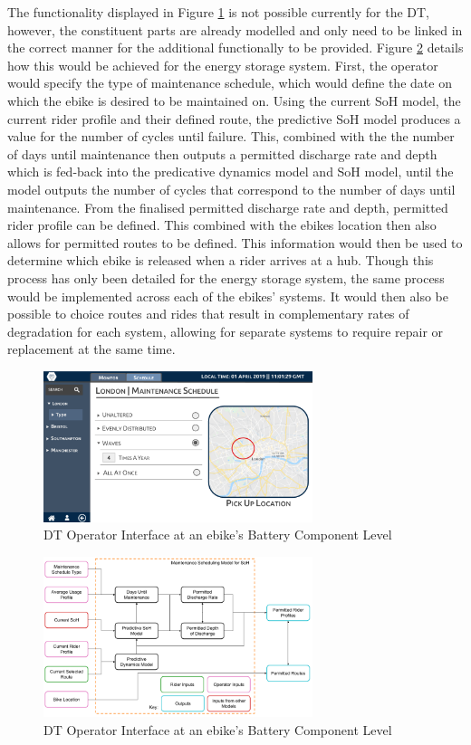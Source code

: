 \documentclass[a4paper, 10pt]{article}
\numberwithin{equation}{section}
\begin{document}
The functionality displayed in Figure \ref{fig:GUI_sch} is  not possible currently for the DT, however, the constituent parts are already modelled and only need to be linked in the correct manner for the additional functionally to be provided. Figure \ref{fig:GUI_SoH} details how this would be achieved for the energy storage system. First, the operator would specify the type of maintenance schedule, which would define the date on which the ebike is desired to be maintained on. Using the current SoH model, the current rider profile and their defined route, the predictive SoH model produces a value for the number of cycles until failure. This, combined with the the number of days until maintenance then outputs a permitted discharge rate and depth which is fed-back into the  predicative dynamics model and SoH model, until the model outputs the number of cycles that correspond to the number of days until maintenance. From the finalised permitted discharge rate and depth, permitted rider profile can be defined. This combined with the ebikes location then also allows for permitted routes to be defined. This information would then be used to determine which ebike is released when a rider arrives at a hub. Though this process has only been detailed for the energy storage system, the same process would be implemented across each of the ebikes' systems. It would then also be possible to choice routes and rides that result in complementary rates of degradation for each system, allowing for separate systems to require repair or replacement at the same time.




\begin{figure}[h]
\centering
\includegraphics[width=0.7\textwidth]{images/GUI_schedule.png}
\caption{DT Operator Interface at an ebike's Battery Component Level}
\label{fig:GUI_sch}
\end{figure}

\begin{figure}[h]
\centering
\includegraphics[width=0.7\textwidth]{images/GUI_SoH}
\caption{DT Operator Interface at an ebike's Battery Component Level}
\label{fig:GUI_SoH}
\end{figure}
\end{document}
